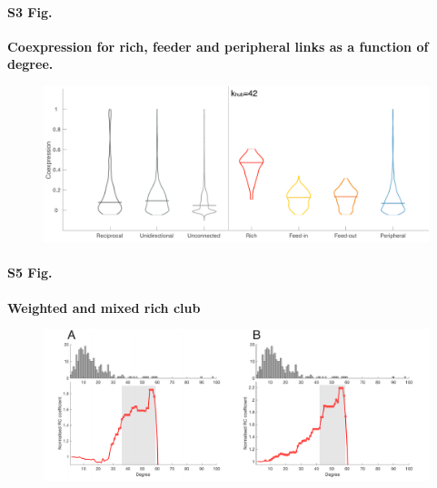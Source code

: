 \documentclass[10pt,letterpaper]{article}
\begin{document}
\paragraph*{S3 Fig.}
{\bf Coexpression for rich, feeder and peripheral links as a function of degree.}
\begin{figure}[!h]
\label{S4_Fig}
\centering
    \includegraphics[width=1\textwidth]{Distributions.pdf}
\end{figure}

\paragraph*{S5 Fig.}
{\bf Weighted and mixed rich club}
\begin{figure}[!h]
\label{S6_Fig}
\centering
    \includegraphics[width=1\textwidth]{WeightedMixedRC.pdf}
\end{figure}


\end{document}
